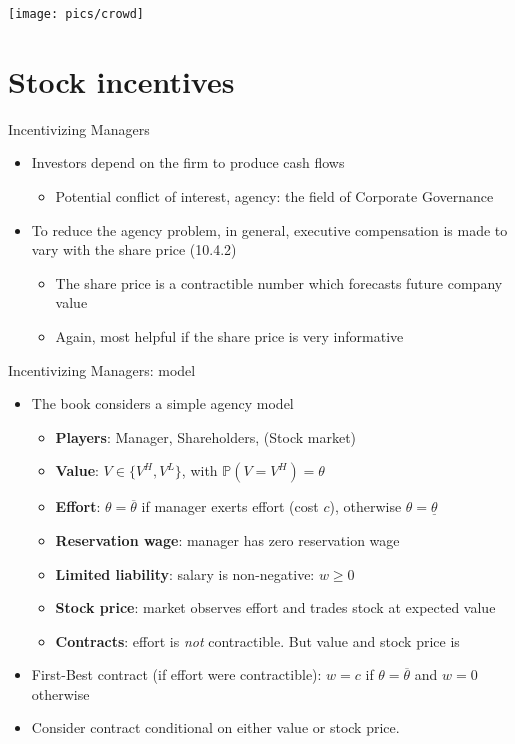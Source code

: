 \documentclass[english,10pt
,aspectratio=169
]{beamer}
\begin{document}
\begin{frame}
	\centering
	\texttt{[image: pics/crowd]}
\end{frame}


\section{Stock incentives}

\begin{frame}{Incentivizing Managers}
	\begin{itemize}
		\item Investors depend on the firm to produce cash flows 
		\begin{itemize}
			\item Potential conflict of interest, agency: the field of Corporate Governance
		\end{itemize}
		\item To reduce the agency problem, in general, executive compensation is made to vary with the share price (10.4.2)
		\begin{itemize}
			\item The share price is a contractible number which forecasts future company value
			\item Again, most helpful if the share price is very informative
		\end{itemize}
	\end{itemize}
\end{frame}


\begin{frame}{Incentivizing Managers: model}
	\begin{itemize}
		\item The book considers a simple agency model
		\begin{itemize}
			\item \textbf{Players}: Manager, Shareholders, (Stock market)
			\item \textbf{Value}: $V \in \{V^{H}, V^{L}\}$, with $\mathbb{P}(V=V^{H})=\theta$
			\item \textbf{Effort}: $\theta=\overline{\theta}$ if manager exerts effort (cost $c$), otherwise $\theta=\underline{\theta}$
			\item \textbf{Reservation wage}: manager has zero reservation wage
			\item \textbf{Limited liability}: salary is non-negative: $w \geq 0$
			\item \textbf{Stock price}: market observes effort and trades stock at expected value
			\item \textbf{Contracts}: effort is \textit{not} contractible. But value and stock price is
		\end{itemize}
		\item First-Best contract (if effort were contractible): $w=c$ if $\theta=\overline{\theta}$ and $w=0$ otherwise
		\item Consider contract conditional on either value or stock price.
	\end{itemize}
\end{frame}
\end{document}
